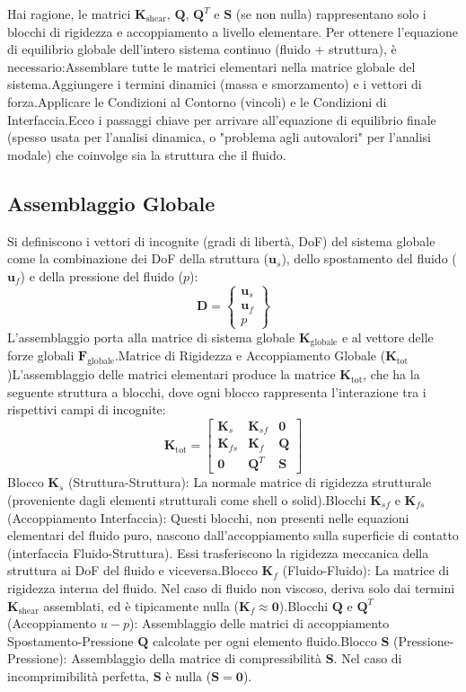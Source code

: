\documentclass{article}
\begin{document}
Hai ragione, le matrici $\mathbf{K}_{\text{shear}}$, $\mathbf{Q}$, $\mathbf{Q}^T$ e $\mathbf{S}$ (se non nulla) rappresentano solo i blocchi di rigidezza e accoppiamento a livello elementare. Per ottenere l'equazione di equilibrio globale dell'intero sistema continuo (fluido + struttura), è necessario:Assemblare tutte le matrici elementari nella matrice globale del sistema.Aggiungere i termini dinamici (massa e smorzamento) e i vettori di forza.Applicare le Condizioni al Contorno (vincoli) e le Condizioni di Interfaccia.Ecco i passaggi chiave per arrivare all'equazione di equilibrio finale (spesso usata per l'analisi dinamica, o "problema agli autovalori" per l'analisi modale) che coinvolge sia la struttura che il fluido.
\subsection{ Assemblaggio Globale}
 
 Si definiscono i vettori di incognite (gradi di libertà, DoF) del sistema globale come la combinazione dei DoF della struttura ($\mathbf{u}_s$), dello spostamento del fluido ($\mathbf{u}_f$) e della pressione del fluido ($p$):$$\mathbf{D} = \begin{Bmatrix} \mathbf{u}_s \\ \mathbf{u}_f \\ p \end{Bmatrix}$$L'assemblaggio porta alla matrice di sistema globale $\mathbf{K}_{\text{globale}}$ e al vettore delle forze globali $\mathbf{F}_{\text{globale}}$.Matrice di Rigidezza e Accoppiamento Globale ($\mathbf{K}_{\text{tot}}$)L'assemblaggio delle matrici elementari produce la matrice $\mathbf{K}_{\text{tot}}$, che ha la seguente struttura a blocchi, dove ogni blocco rappresenta l'interazione tra i rispettivi campi di incognite:$$\mathbf{K}_{\text{tot}} = \begin{bmatrix}
\mathbf{K}_{s} & \mathbf{K}_{sf} & \mathbf{0} \\
\mathbf{K}_{fs} & \mathbf{K}_{f} & \mathbf{Q} \\
\mathbf{0} & \mathbf{Q}^{T} & \mathbf{S}
\end{bmatrix}$$Blocco $\mathbf{K}_{s}$ (Struttura-Struttura): La normale matrice di rigidezza strutturale (proveniente dagli elementi strutturali come shell o solid).Blocchi $\mathbf{K}_{sf}$ e $\mathbf{K}_{fs}$ (Accoppiamento Interfaccia): Questi blocchi, non presenti nelle equazioni elementari del fluido puro, nascono dall'accoppiamento sulla superficie di contatto (interfaccia Fluido-Struttura). Essi trasferiscono la rigidezza meccanica della struttura ai DoF del fluido e viceversa.Blocco $\mathbf{K}_{f}$ (Fluido-Fluido): La matrice di rigidezza interna del fluido. Nel caso di fluido non viscoso, deriva solo dai termini $\mathbf{K}_{\text{shear}}$ assemblati, ed è tipicamente nulla ($\mathbf{K}_{f} \approx \mathbf{0}$).Blocchi $\mathbf{Q}$ e $\mathbf{Q}^{T}$ (Accoppiamento $u-p$): Assemblaggio delle matrici di accoppiamento Spostamento-Pressione $\mathbf{Q}$ calcolate per ogni elemento fluido.Blocco $\mathbf{S}$ (Pressione-Pressione): Assemblaggio della matrice di compressibilità $\mathbf{S}$. Nel caso di incomprimibilità perfetta, $\mathbf{S}$ è nulla ($\mathbf{S} = \mathbf{0}$).
\end{document}
